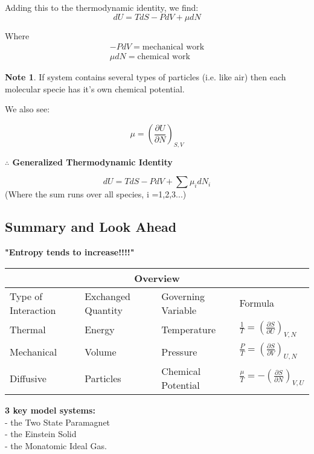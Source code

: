 \documentclass[11pt]{article}
\theoremstyle{definition}
\newtheorem{note}{Note}
\begin{document}
Adding this to the thermodynamic identity, we find:
\begin{equation}
  dU = TdS - PdV + \mu dN  
\end{equation}

Where
\begin{equation*}
\begin{split}
-PdV = \text{mechanical work}\\
\mu dN = \text{chemical work}
\end{split}
\end{equation*}

\begin{note}
If system contains several types of particles (i.e. like air) then each molecular specie has it's own chemical potential.

We also see:
\end{note}
\[ \mu = \left(\frac{\partial U}{\partial N}\right)_{S,V}\]

\textbf{$\therefore$ Generalized Thermodynamic Identity}

\begin{equation}
    dU = TdS - PdV + \sum \mu_i dN_i
\end{equation}
(Where the sum runs over all species, i =1,2,3...)

\subsection{Summary and Look Ahead}

\textbf{"Entropy tends to increase!!!!"}

\begin{tabular}{ |p{3.5cm}|p{3.5cm}|p{3.5cm}|p{3cm}|  }
 \hline
 \multicolumn{4}{|c|}{Overview} \\
 \hline
 Type of Interaction & Exchanged Quantity & Governing Variable & Formula\\
 \hline
 Thermal   & Energy    & Temperature &   $\frac{1}{T} = \left(\frac{\partial S}{\partial U}\right)_{V,N} $\\
 Mechanical &   Volume  & Pressure   & $\frac{P}{T} = \left(\frac{\partial S}{\partial V}\right)_{U,N} $\\
 Diffusive & Particles & Chemical Potential & $\frac{\mu}{T} = -\left(\frac{\partial S}{\partial N}\right)_{V,U} $\\
 \hline
\end{tabular}

\textbf{3 key model systems:}\\ - the Two State Paramagnet\\ - the Einstein Solid\\ - the Monatomic Ideal Gas.
\end{document}
